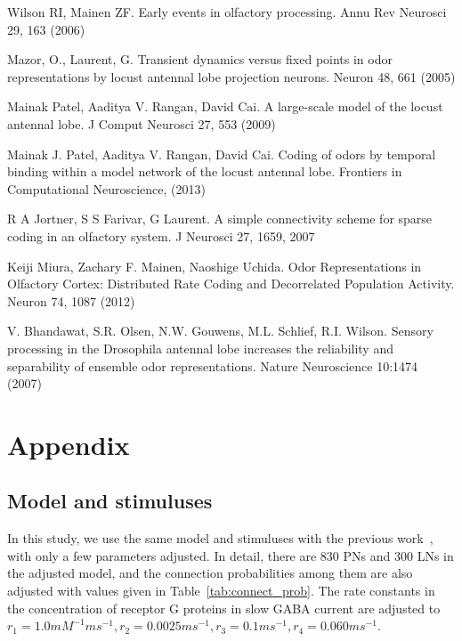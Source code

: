\documentclass[12pt, a4paper]{article}
\begin{document}
\begin{thebibliography}{99} \scriptsize

Wilson RI, Mainen ZF. Early events in olfactory processing. Annu Rev Neurosci 29, 163 (2006)

Mazor, O., Laurent, G. Transient dynamics versus fixed points in odor representations by locust antennal lobe projection neurons. Neuron 48, 661 (2005)

Mainak Patel, Aaditya V. Rangan, David Cai. A large-scale model of the locust antennal lobe. J Comput Neurosci 27, 553 (2009)

Mainak J. Patel, Aaditya V. Rangan, David Cai. Coding of odors by temporal binding within a model network of the locust antennal lobe. Frontiers in Computational Neuroscience, (2013)

R A Jortner, S S Farivar, G Laurent. A simple connectivity scheme for sparse coding in an olfactory system. J Neurosci 27, 1659, 2007

Keiji Miura, Zachary F. Mainen, Naoshige Uchida. Odor Representations in Olfactory Cortex: Distributed Rate Coding and Decorrelated Population Activity. Neuron 74, 1087 (2012)

V. Bhandawat, S.R. Olsen, N.W. Gouwens, M.L. Schlief, R.I. Wilson. Sensory processing in the Drosophila antennal lobe increases the reliability and separability of ensemble odor representations. Nature Neuroscience 10:1474 (2007)



\end{thebibliography}

\newpage{}
\section*{Appendix} \label{Sect:appendix}
\subsection*{Model and stimuluses} \label{Sect:model}
In this study, we use the same model and stimuluses with the previous work~\citep{}, with only a few parameters adjusted. In detail, there are 830 PNs and 300 LNs in the adjusted model, and the connection probabilities among them are also adjusted with values given in Table~\ref{tab:connect_prob}. The rate constants in the concentration of receptor G proteins in slow GABA current are adjusted to $r_1 = 1.0 mM^{-1}ms^{-1}, r_2 = 0.0025 ms^{-1}, r_3 = 0.1 ms^{-1}, r_4 = 0.060 ms^{-1}$.
\end{document}
